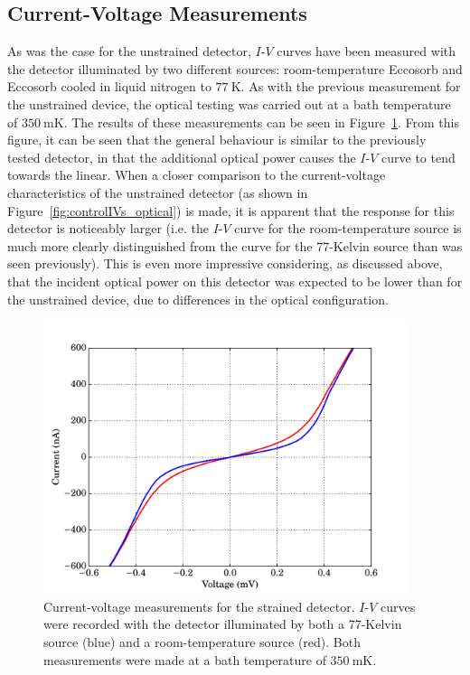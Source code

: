 \subsection{Current-Voltage Measurements}\label{ssec:opticalStrainedSi_IV}
As was the case for the unstrained detector, $I$-$V$ curves have been measured with the detector illuminated by two different sources: room-temperature Eccosorb and Eccosorb cooled in liquid nitrogen to $77~\mathrm{K}$. As with the previous measurement for the unstrained device, the optical testing was carried out at a bath temperature of $350~\mathrm{mK}$. The results of these measurements can be seen in Figure~\ref{fig:strainedIVs_optical}. From this figure, it can be seen that the general behaviour is similar to the previously tested detector, in that the additional optical power causes the $I$-$V$ curve to tend towards the linear. When a closer comparison to the current-voltage characteristics of the unstrained detector (as shown in Figure~\ref{fig:controlIVs_optical}) is made, it is apparent that the response for this detector is noticeably larger (i.e. the $I$-$V$ curve for the room-temperature source is much more clearly distinguished from the curve for the 77-Kelvin source than was seen previously). This is even more impressive considering, as discussed above, that the incident optical power on this detector was expected to be lower than for the unstrained device, due to differences in the optical configuration.
\begin{figure}[tb]
\begin{center}
\includegraphics[width = 0.95\textwidth]{figures/strained_IVs_77_300}
\caption[Current-voltage measurements for an optically-loaded strained SiCEB]{Current-voltage measurements for the strained detector. {$I$-$V$} curves were recorded with the detector illuminated by both a 77-Kelvin source (blue) and a room-temperature source (red). Both measurements were made at a bath temperature of $350~\mathrm{mK}$.}
\label{fig:strainedIVs_optical}
\end{center}
\end{figure}
